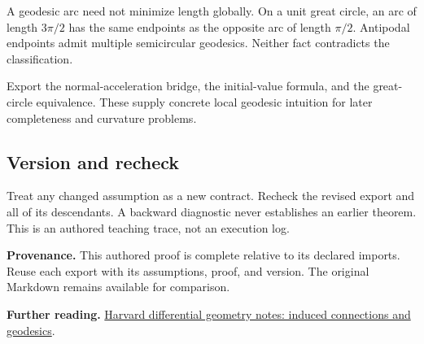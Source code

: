 \documentclass[preprint,12pt,aps,pra,showkeys,amsmath,amssymb,superscriptaddress,floatfix]{revtex4-2}
\theoremstyle{definition}
\theoremstyle{remark}
\begin{document}
A geodesic arc need not minimize length globally. On a unit great
circle, an arc of length \(3\pi /2\) has the same endpoints as the
opposite arc of length \(\pi /2\). Antipodal endpoints admit multiple
semicircular geodesics. Neither fact contradicts the classification.

Export the normal-acceleration bridge, the initial-value formula, and
the great-circle equivalence. These supply concrete local geodesic
intuition for later completeness and curvature problems.

\subsection{Version and recheck}
Treat any changed assumption as a new contract. Recheck the revised
export and all of its descendants. A backward diagnostic never
establishes an earlier theorem. This is an authored teaching trace, not
an execution log.

\par\medskip\begingroup\small\linespread{1.0}\selectfont\noindent\textbf{Provenance.} This authored proof is complete relative to its declared imports. Reuse
each export with its assumptions, proof, and version. The original
Markdown remains available for comparison.
\par\endgroup

\par\smallskip\begingroup\small\linespread{1.0}\selectfont\noindent\textbf{Further reading.} \href{https://people.math.harvard.edu/~landesman/assets/math-230a-harvard-differential-geometry-notes.pdf}{Harvard
differential geometry notes: induced connections and geodesics}.\par\endgroup
\end{document}
